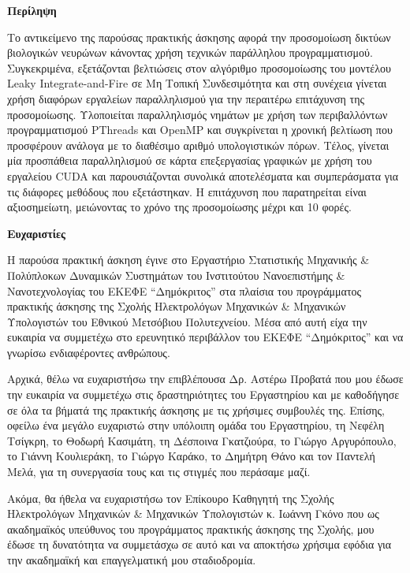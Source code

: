 \documentclass[12pt,a4paper]{article}
\begin{document}
\newpage

\centerline{\noindent \textbf{Περίληψη}}
\vspace{0.5cm}
Το αντικείμενο της παρούσας πρακτικής άσκησης αφορά την προσομοίωση δικτύων βιολογικών νευρώνων κάνοντας χρήση τεχνικών παράλληλου προγραμματισμού. Συγκεκριμένα, εξετάζονται βελτιώσεις στον αλγόριθμο προσομοίωσης του μοντέλου Leaky Integrate-and-Fire σε Μη Τοπική Συνδεσιμότητα και στη συνέχεια γίνεται χρήση διαφόρων εργαλείων παραλληλισμού για την περαιτέρω επιτάχυνση της προσομοίωσης. Υλοποιείται παραλληλισμός νημάτων με χρήση των περιβαλλόντων προγραμματισμού PThreads και OpenMP και συγκρίνεται η χρονική βελτίωση που προσφέρουν ανάλογα με το διαθέσιμο αριθμό υπολογιστικών πόρων. Τέλος, γίνεται μία προσπάθεια παραλληλισμού σε κάρτα επεξεργασίας γραφικών με χρήση του εργαλείου CUDA και παρουσιάζονται συνολικά αποτελέσματα και συμπεράσματα για τις διάφορες μεθόδους που εξετάστηκαν. Η επιτάχυνση που παρατηρείται είναι αξιοσημείωτη, μειώνοντας το χρόνο της προσομοίωσης μέχρι και 10 φορές.

\newpage

\centerline{\noindent \textbf{Ευχαριστίες}}
\vspace{0.5cm}
Η παρούσα πρακτική άσκηση έγινε στο Εργαστήριο Στατιστικής Μηχανικής \& Πολύπλοκων Δυναμικών Συστημάτων του Ινστιτούτου Νανοεπιστήμης \& Νανοτεχνολογίας του ΕΚΕΦΕ ``Δημόκριτος'' στα πλαίσια του προγράμματος πρακτικής άσκησης της Σχολής Ηλεκτρολόγων Μηχανικών \& Μηχανικών Υπολογιστών του Εθνικού Μετσόβιου Πολυτεχνείου. Μέσα από αυτή είχα την ευκαιρία να συμμετέχω στο ερευνητικό περιβάλλον του ΕΚΕΦΕ ``Δημόκριτος'' και να γνωρίσω ενδιαφέροντες ανθρώπους. 

Αρχικά, θέλω να ευχαριστήσω την επιβλέπουσα Δρ. Αστέρω Προβατά που μου έδωσε την ευκαιρία να συμμετέχω στις δραστηριότητες του Εργαστηρίου και με καθοδήγησε σε όλα τα βήματά της πρακτικής άσκησης με τις χρήσιμες συμβουλές της. Επίσης, οφείλω ένα μεγάλο ευχαριστώ στην υπόλοιπη ομάδα του Εργαστηρίου, τη Νεφέλη Τσίγκρη, το Θοδωρή Κασιμάτη, τη Δέσποινα Γκατζιούρα, το Γιώργο Αργυρόπουλο, το Γιάννη Κουλιεράκη, το Γιώργο Καράκο, το Δημήτρη Θάνο και τον Παντελή Μελά, για τη συνεργασία τους και τις στιγμές που περάσαμε μαζί.

Ακόμα, θα ήθελα να ευχαριστήσω τον Επίκουρο Καθηγητή της Σχολής Ηλεκτρολόγων Μηχανικών \& Μηχανικών Υπολογιστών κ. Ιωάννη Γκόνο που ως ακαδημαϊκός υπεύθυνος του προγράμματος πρακτικής άσκησης της Σχολής, μου έδωσε τη δυνατότητα να συμμετάσχω σε αυτό και να αποκτήσω χρήσιμα εφόδια για την ακαδημαϊκή και επαγγελματική μου σταδιοδρομία.
\end{document}
